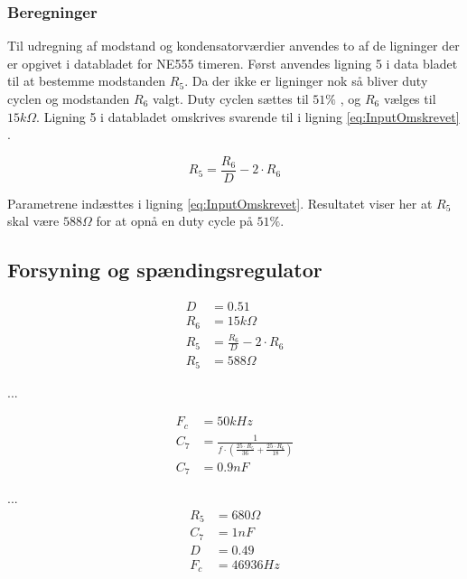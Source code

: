 \subsubsection{Beregninger}
Til udregning af modstand og kondensatorværdier anvendes to af de ligninger der er opgivet i databladet for NE555 timeren. Først anvendes ligning 5 i data bladet til at bestemme modstanden $R_5$. Da der ikke er ligninger nok så bliver duty cyclen og modstanden $R_6$ valgt. Duty cyclen sættes til $51 \% $ , og $R_6$ vælges til $15k \Omega $. Ligning 5 i databladet omskrives svarende til i ligning \ref{eq:InputOmskrevet} .

\begin{equation}
\label{eq:InputOmskrevet}
R_5 = \frac{R_6}{D} - 2 \cdot R_6
\end{equation}

Parametrene indæsttes i ligning \ref{eq:InputOmskrevet}.
Resultatet viser her at $R_5$ skal være $588 \Omega $ for at opnå en duty cycle på $51 \% $.
\subsection{Forsyning og spændingsregulator}
\begin{equation}
\label{eq:InputsModstand}
\begin{split}
D & = 0.51\\
R_6 & = 15k \Omega \\
R_5 & = \frac{R_6}{D} - 2 \cdot R_6 \\
R_5 & = 588 \Omega 
\end{split}
\end{equation}

... 

\begin{equation}
\label{eq:TriggerKondensator}
\begin{split}
F_c & = 50kHz \\
C_7 & = \frac{1}{f \cdot \left( \frac{25 \cdot R_5 }{36} + \frac{25 \cdot R_6}{18} \right) }\\
C_7 & = 0.9nF
\end{split}
\end{equation}

...
\begin{equation}
\label{eq:TimerTilnaermedeVaerdier}
\begin{split}
R_5 & = 680 \Omega \\
C_7 & = 1nF \\
D & = 0.49 \\
F_c & = 46936Hz
\end{split}
\end{equation}

